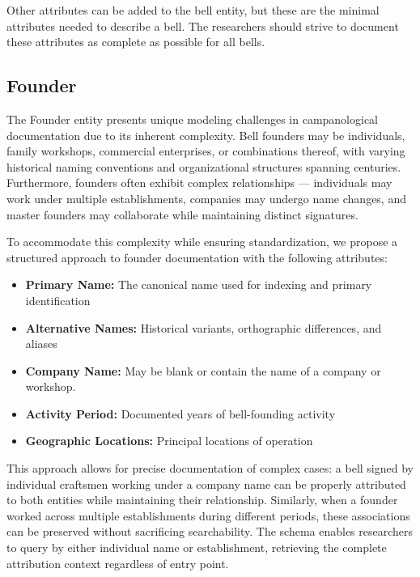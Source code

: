 \documentclass[11pt, a4paper]{article}
\begin{document}
Other attributes can be added to the bell entity, but these are the minimal attributes needed to describe a bell. The researchers should strive 
to document these attributes as complete as possible for all bells.

\subsection{Founder}

The Founder entity presents unique modeling challenges in campanological documentation due to its inherent complexity. 
Bell founders may be individuals, family workshops, commercial enterprises, or combinations thereof, with varying historical 
naming conventions and organizational structures spanning centuries. Furthermore, founders often exhibit complex 
relationships — individuals may work under multiple establishments, companies may undergo name changes, and master founders 
may collaborate while maintaining distinct signatures.

To accommodate this complexity while ensuring standardization, we propose a structured approach to founder documentation with the following attributes:

\begin{itemize}
    \item \textbf{Primary Name:} The canonical name used for indexing and primary identification
    \item \textbf{Alternative Names:} Historical variants, orthographic differences, and aliases
    \item \textbf{Company Name:} May be blank or contain the name of a company or workshop.
    \item \textbf{Activity Period:} Documented years of bell-founding activity
    \item \textbf{Geographic Locations:} Principal locations of operation
\end{itemize}

This approach allows for precise documentation of complex cases: a bell signed by individual craftsmen working under a company name 
can be properly attributed to both entities while maintaining their relationship. Similarly, when a founder worked across multiple 
establishments during different periods, these associations can be preserved without sacrificing searchability. 
The schema enables researchers to query by either individual name or establishment, retrieving the complete attribution context 
regardless of entry point.
\end{document}
